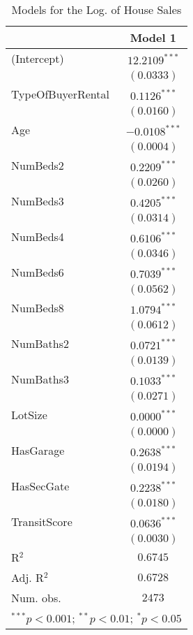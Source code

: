 
\begin{table}
\begin{center}
\begin{tabular}{l c}
\hline
 & Model 1 \\
\hline
(Intercept)       & $12.2109^{***}$ \\
                  & $(0.0333)$      \\
TypeOfBuyerRental & $0.1126^{***}$  \\
                  & $(0.0160)$      \\
Age               & $-0.0108^{***}$ \\
                  & $(0.0004)$      \\
NumBeds2          & $0.2209^{***}$  \\
                  & $(0.0260)$      \\
NumBeds3          & $0.4205^{***}$  \\
                  & $(0.0314)$      \\
NumBeds4          & $0.6106^{***}$  \\
                  & $(0.0346)$      \\
NumBeds6          & $0.7039^{***}$  \\
                  & $(0.0562)$      \\
NumBeds8          & $1.0794^{***}$  \\
                  & $(0.0612)$      \\
NumBaths2         & $0.0721^{***}$  \\
                  & $(0.0139)$      \\
NumBaths3         & $0.1033^{***}$  \\
                  & $(0.0271)$      \\
LotSize           & $0.0000^{***}$  \\
                  & $(0.0000)$      \\
HasGarage         & $0.2638^{***}$  \\
                  & $(0.0194)$      \\
HasSecGate        & $0.2238^{***}$  \\
                  & $(0.0180)$      \\
TransitScore      & $0.0636^{***}$  \\
                  & $(0.0030)$      \\
\hline
R$^2$             & $0.6745$        \\
Adj. R$^2$        & $0.6728$        \\
Num. obs.         & $2473$          \\
\hline
\multicolumn{2}{l}{\scriptsize{$^{***}p<0.001$; $^{**}p<0.01$; $^{*}p<0.05$}}
\end{tabular}
\caption{Models for the Log. of House Sales}
\label{tab:reg_comp}
\end{center}
\end{table}
